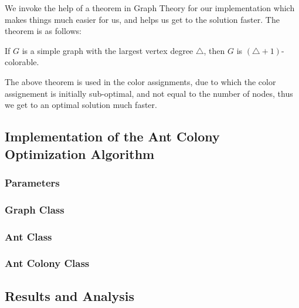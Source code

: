 \documentclass{article}
\theoremstyle{mytheoremstyle}
\theoremstyle{mytheoremstyle}
\theoremstyle{myproblemstyle}
\begin{document}
We invoke the help of a theorem in Graph Theory for our implementation which makes things much easier for us, and helps us get to the solution faster. The theorem is as follows:
\begin{theorem}
    If $G$ is a simple graph with the largest vertex degree $ \triangle $, then $G$ is $ (\triangle + 1) $-colorable.
\end{theorem}
The above theorem is used in the color assignments, due to which the color assignement is initially sub-optimal, and not equal to the number of nodes, thus we get to an optimal solution much faster.

\subsection{Implementation of the Ant Colony Optimization Algorithm}
\subsubsection{Parameters}
\subsubsection{Graph Class}
\subsubsection{Ant Class}
\subsubsection{Ant Colony Class}

\subsection{Results and Analysis}
\end{document}
